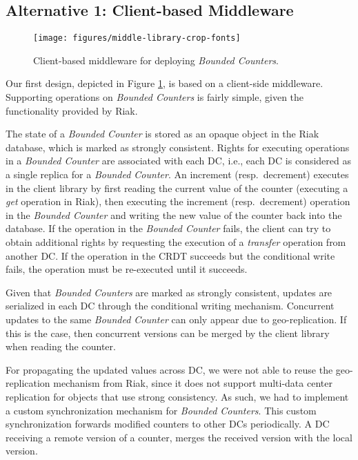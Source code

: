 \documentclass[conference]{IEEEtran}
\newcommand{\InvCounter}{\emph{Bounded Counter}}
\newcommand{\InvCounters}{\emph{Bounded Counters}}
\begin{document}
\subsection{Alternative 1: Client-based Middleware}\label{sec:deploy:cltlib}

\begin{figure}
\texttt{[image: figures/middle-library-crop-fonts]}
\vspace{-2ex}
\caption{Client-based middleware for deploying \InvCounters{}.}\label{fig:middle:library}
\end{figure}


Our first design, depicted in Figure \ref{fig:middle:library}, is based on a client-side middleware.
Supporting operations on \InvCounters{} is fairly simple, given the functionality provided by Riak.

The state of a \InvCounter{} is stored as an opaque object in the Riak database, which
is marked as strongly consistent.
Rights for executing operations in a \InvCounter{} are associated with each DC, i.e., 
each DC is considered as a single replica for a \InvCounter{}. 
An increment (resp.\ decrement) executes in the client library by first reading 
the current value of the counter (executing a \emph{get} operation in Riak), 
then executing the increment (resp.\ decrement) operation in the \InvCounter{} 
and writing the new value of the counter back into the database. 
If the operation in the \InvCounter{} fails, the client can try to obtain additional 
rights by requesting the execution of a \emph{transfer} operation from another DC. 
If the operation in the CRDT succeeds but the conditional write fails, the operation 
must be re-executed until it succeeds. 

Given that \InvCounters{} are marked as strongly consistent, updates are serialized 
in each DC through the conditional writing mechanism.
Concurrent updates to the same \InvCounter{} can only 
appear due to geo-replication. 
If this is the case, then concurrent versions can be merged by the client 
library when reading the counter.

For propagating the updated values across DC, we were not able to reuse 
the geo-replication mechanism from Riak, since it does not support multi-data 
center replication for objects that use strong consistency. 
As such, we had to implement a custom synchronization mechanism for 
\InvCounters{}.
This custom synchronization forwards modified counters to other DCs periodically.
A DC receiving a remote version of a counter, merges the received version with 
the local version. 
\end{document}
